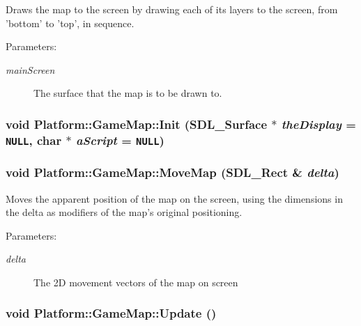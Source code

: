 Draws the map to the screen by drawing each of its layers to the screen, from 'bottom' to 'top', in sequence.

\begin{Desc}
\item[Parameters:]
\begin{description}
\item[{\em mainScreen}]The surface that the map is to be drawn to. \end{description}
\end{Desc}
\hypertarget{class_platform_1_1_game_map_0f5c16cce18b155235588af572cfba7f}{
\subsubsection[{Init}]{\setlength{\rightskip}{0pt plus 5cm}void Platform::GameMap::Init (SDL\_\-Surface $\ast$ {\em theDisplay} = {\tt NULL}, \/  char $\ast$ {\em aScript} = {\tt NULL})}}
\label{de/db6/class_platform_1_1_game_map_0f5c16cce18b155235588af572cfba7f}


\hypertarget{class_platform_1_1_game_map_76634e9c99fe04d801cc324ba0b0ed8a}{
\subsubsection[{MoveMap}]{\setlength{\rightskip}{0pt plus 5cm}void Platform::GameMap::MoveMap (SDL\_\-Rect \& {\em delta})}}
\label{de/db6/class_platform_1_1_game_map_76634e9c99fe04d801cc324ba0b0ed8a}


Moves the apparent position of the map on the screen, using the dimensions in the delta as modifiers of the map's original positioning.

\begin{Desc}
\item[Parameters:]
\begin{description}
\item[{\em delta}]The 2D movement vectors of the map on screen \end{description}
\end{Desc}
\hypertarget{class_platform_1_1_game_map_9d2b0044bfee1914f92ce62db4ff36a9}{
\subsubsection[{Update}]{\setlength{\rightskip}{0pt plus 5cm}void Platform::GameMap::Update ()}}
\label{de/db6/class_platform_1_1_game_map_9d2b0044bfee1914f92ce62db4ff36a9}


